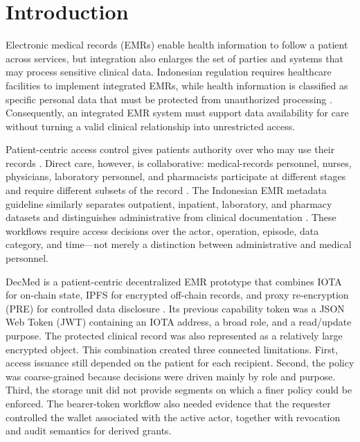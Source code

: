 \section{Introduction}
\label{sec:introduction}

Electronic medical records (EMRs) enable health information to follow a patient across services, but integration also enlarges the set of parties and systems that may process sensitive clinical data. Indonesian regulation requires healthcare facilities to implement integrated EMRs, while health information is classified as specific personal data that must be protected from unauthorized processing \cite{permenkes24_2022,uu27-2022-pdp}. Consequently, an integrated EMR system must support data availability for care without turning a valid clinical relationship into unrestricted access.

Patient-centric access control gives patients authority over who may use their records \cite{peng2023patientcentric}. Direct care, however, is collaborative: medical-records personnel, nurses, physicians, laboratory personnel, and pharmacists participate at different stages and require different subsets of the record \cite{who2010_interprofessional_collaborative_practice}. The Indonesian EMR metadata guideline similarly separates outpatient, inpatient, laboratory, and pharmacy datasets and distinguishes administrative from clinical documentation \cite{kemenkes1423-2022}. These workflows require access decisions over the actor, operation, episode, data category, and time---not merely a distinction between administrative and medical personnel.

DecMed is a patient-centric decentralized EMR prototype that combines IOTA for on-chain state, IPFS for encrypted off-chain records, and proxy re-encryption (PRE) for controlled data disclosure \cite{sadewa2025decmed}. Its previous capability token was a JSON Web Token (JWT) containing an IOTA address, a broad role, and a read/update purpose. The protected clinical record was also represented as a relatively large encrypted object. This combination created three connected limitations. First, access issuance still depended on the patient for each recipient. Second, the policy was coarse-grained because decisions were driven mainly by role and purpose. Third, the storage unit did not provide segments on which a finer policy could be enforced. The bearer-token workflow also needed evidence that the requester controlled the wallet associated with the active actor, together with revocation and audit semantics for derived grants.


